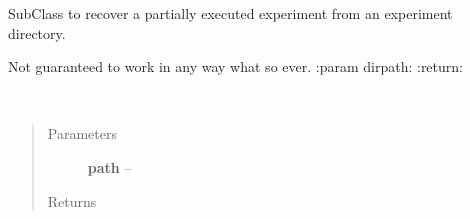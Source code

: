 \documentclass[letterpaper,10pt,english]{sphinxmanual}
\begin{document}

\begin{fulllineitems}
\label{index:polybos.RecoveredExperiment}
SubClass to recover a partially executed experiment from an experiment directory.

Not guaranteed to work in any way what so ever.
:param dirpath:
:return:

\begin{fulllineitems}
\label{index:polybos.RecoveredExperiment.walk_dir}~\begin{quote}\begin{description}
\item[{Parameters}] \leavevmode
\textbf{path} -- 

\item[{Returns}] \leavevmode


\end{description}\end{quote}

\end{fulllineitems}


\end{fulllineitems}

\end{document}
